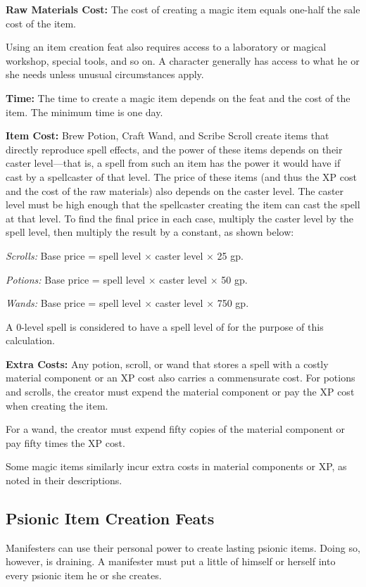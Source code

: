 \textbf{Raw Materials Cost:} The cost of creating a magic item equals one-half the sale cost of the item.

Using an item creation feat also requires access to a laboratory or magical workshop, special tools, and so on. A character generally has access to what he or she needs unless unusual circumstances apply.

\textbf{Time:} The time to create a magic item depends on the feat and the cost of the item. The minimum time is one day.

\textbf{Item Cost:} Brew Potion, Craft Wand, and Scribe Scroll create items that directly reproduce spell effects, and the power of these items depends on their caster level---that is, a spell from such an item has the power it would have if cast by a spellcaster of that level. The price of these items (and thus the XP cost and the cost of the raw materials) also depends on the caster level. The caster level must be high enough that the spellcaster creating the item can cast the spell at that level. To find the final price in each case, multiply the caster level by the spell level, then multiply the result by a constant, as shown below:

\textit{Scrolls:} Base price = spell level $\times$ caster level $\times$ 25 gp.

\textit{Potions:} Base price = spell level $\times$ caster level $\times$ 50 gp.

\textit{Wands:} Base price = spell level $\times$ caster level $\times$ 750 gp.

A 0-level spell is considered to have a spell level of \onehalf for the purpose of this calculation.

\textbf{Extra Costs:} Any potion, scroll, or wand that stores a spell with a costly material component or an XP cost also carries a commensurate cost. For potions and scrolls, the creator must expend the material component or pay the XP cost when creating the item.

For a wand, the creator must expend fifty copies of the material component or pay fifty times the XP cost.

Some magic items similarly incur extra costs in material components or XP, as noted in their descriptions.


\subsection{Psionic Item Creation Feats}
Manifesters can use their personal power to create lasting psionic items. Doing so, however, is draining. A manifester must put a little of himself or herself into every psionic item he or she creates.

